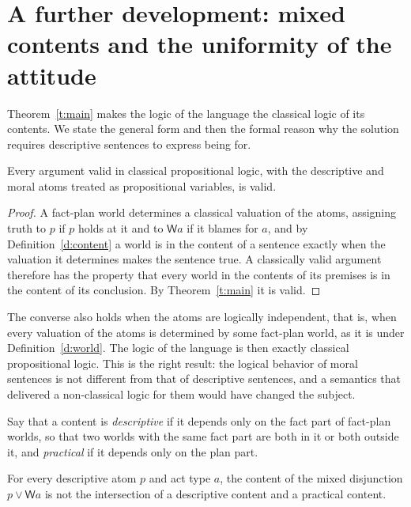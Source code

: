 \documentclass{situationist-preprint}
\begin{document}
\section{A further development: mixed contents and the uniformity of the attitude}\label{s:further}

Theorem~\ref{t:main} makes the logic of the language the classical logic of its contents. We state the general form and then the formal reason why the solution requires descriptive sentences to express being for.

\begin{proposition}\label{p:classical}
Every argument valid in classical propositional logic, with the descriptive and moral atoms treated as propositional variables, is valid.
\end{proposition}

\begin{proof}
A fact-plan world determines a classical valuation of the atoms, assigning truth to $p$ if $p$ holds at it and to $\mathsf{W}a$ if it blames for $a$, and by Definition~\ref{d:content} a world is in the content of a sentence exactly when the valuation it determines makes the sentence true. A classically valid argument therefore has the property that every world in the contents of its premises is in the content of its conclusion. By Theorem~\ref{t:main} it is valid.
\end{proof}

The converse also holds when the atoms are logically independent, that is, when every valuation of the atoms is determined by some fact-plan world, as it is under Definition~\ref{d:world}. The logic of the language is then exactly classical propositional logic. This is the right result: the logical behavior of moral sentences is not different from that of descriptive sentences, and a semantics that delivered a non-classical logic for them would have changed the subject.

Say that a content is \emph{descriptive} if it depends only on the fact part of fact-plan worlds, so that two worlds with the same fact part are both in it or both outside it, and \emph{practical} if it depends only on the plan part.

\begin{proposition}\label{p:mixed}
For every descriptive atom $p$ and act type $a$, the content of the mixed disjunction $p\vee\mathsf{W}a$ is not the intersection of a descriptive content and a practical content.
\end{proposition}
\end{document}
